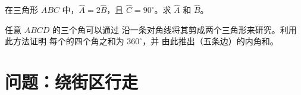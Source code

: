 \begin{exercise}[$\star\star$]\label{exo:g7:triangles:10}
在三角形 $ABC$ 中，$\widehat A = 2\widehat B$，且
$\widehat C = 90^\circ$。求 $\widehat A$ 和 $\widehat B$。
\end{exercise}

\begin{exercise}[$\star\star\star$]\label{exo:g7:triangles:11}
任意 $ABCD$ 的三个角可以通过
沿一条对角线将其剪成两个三角形来研究。利用此方法证明
每个的四个角之和为 $360^\circ$，并
由此推出（五条边）的内角和。
\end{exercise}

\section{问题：绕街区行走}

